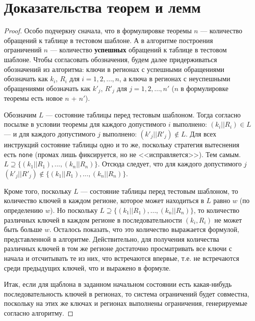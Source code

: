 \chapter{Доказательства теорем и лемм}\label{sec:proofs}

\theoremtext{\ref{mirror_fullness_none}}{\FullnessMirrorNone}
\begin{proof}
  Особо подчеркну сначала, что в формулировке теоремы $n$ --- количество обращений к таблице в тестовом шаблоне. А в алгоритме построения ограничений $n$ --- количество \textbf{успешных} обращений к таблице в тестовом шаблоне. Чтобы согласовать обозначения, будем далее придерживаться обозначений из алгоритма: ключи в регионах с успешными обращениями обозначать как $k_i$, $R_i$ для $i = 1, 2, ..., n$, а ключа в регионах с неуспешными обращениями обозначать как $k'_j$, $R'_j$ для $j = 1, 2, ..., n'$ ($n$ в формулировке теоремы есть новое $n$ + $n'$).
  
  Обозначим $L$ --- состояние таблицы перед тестовым шаблоном. Тогда согласно посылке в условии теоремы для каждого допустимого $i$ выполнено: $(k_i || R_i) \in L$ --- и для каждого допустимого $j$ выполнено: $(k'_j || R'_j) \notin L$. Для всех инструкций состояние таблицы одно и то же, поскольку стратегия вытеснения есть \texttt{none} (промах лишь фиксируется, но не <<исправляется>>). Тем самым. $L \supseteq \{ (k_1||R_1), ..., (k_n||R_n) \}$. Отсюда следует, что для каждого допустимого $j$ $(k'_j||R'_j) \notin \{ (k_1||R_1), ..., (k_n||R_n) \}$.
  
  Кроме того, поскольку $L$ --- состояние таблицы перед тестовым шаблоном, то количество ключей в каждом регионе, которое может находиться в $L$ равно $w$ (по определению $w$). Но поскольку $L \supseteq \{ (k_1||R_1), ..., (k_n||R_n) \}$, то количество различных ключей в каждом регионе в последовательности $(k_i, R_i)$ не может быть больше $w$. Осталось показать, что это количество выражается формулой, представленной в алгоритме. Действительно, для получения количества различных ключей в том же регионе достаточно просматривать все ключи с начала и отсчитывать те из них, что встречаются впервые, т.е. не встречаются среди предыдущих ключей, что и выражено в формуле.
  
  Итак, если для щаблона в заданном начальном состоянии есть какая-нибудь последовательность ключей в регионах, то система ограничений будет совместна, поскольку на этих же ключах и регионах выполнены ограничения, генерируемые согласно алгоритму.
\end{proof}

